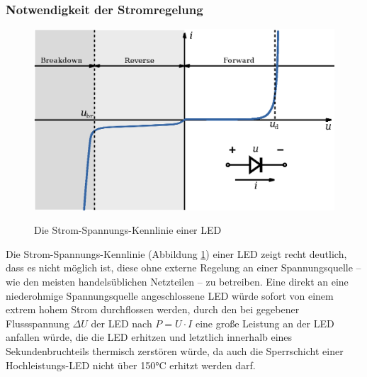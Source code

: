 \documentclass[12pt,a4paper,notitlepage]{article}
\begin{document}
\subsubsection{Notwendigkeit der Stromregelung}
\begin{figure}
\begin{center}
\includegraphics{images/diode-iv-curve_bw.eps}
\label{diode-iv-curve}
\caption{Die Strom-Spannungs-Kennlinie einer LED}
\end{center}
\end{figure}
Die Strom-Spannungs-Kennlinie (Abbildung \ref{diode-iv-curve}) einer \gls{LED} zeigt recht deutlich, dass es nicht möglich ist, diese ohne externe Regelung an einer Spannungsquelle -- wie den meisten handelsüblichen Netzteilen -- zu betreiben. Eine direkt an eine niederohmige Spannungsquelle angeschlossene \gls{LED} würde sofort von einem extrem hohem Strom durchflossen werden, durch den bei gegebener \gls{Flussspannung} $\Delta U$ der \gls{LED} nach $P=U\cdot I$ eine große Leistung an der \gls{LED} anfallen würde, die die \gls{LED} erhitzen und letztlich innerhalb eines Sekundenbruchteils thermisch zerstören würde, da auch die \gls{Sperrschicht} einer Hochleistungs-\gls{LED} nicht über 150°C erhitzt werden darf\cite{PHILIPS1,PHILIPS2}.
\end{document}
